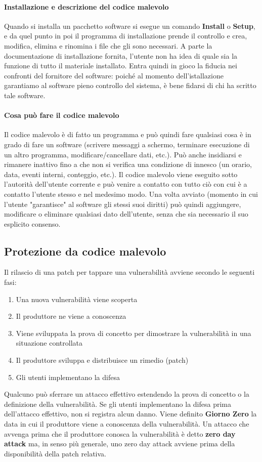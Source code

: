 \paragraph{Installazione e descrizione del codice malevolo}
Quando si installa un pacchetto software si esegue un comando \textbf{Install} o \textbf{Setup}, e da quel punto in poi il programma di installazione prende il controllo e crea, modifica, elimina e rinomina i file che gli sono necessari. A parte la documentazione di installazione fornita, l'utente non ha idea di quale sia la funzione di tutto il materiale installato. Entra quindi in gioco la fiducia nei confronti del fornitore del software: poiché al momento dell'istallazione garantiamo al software pieno controllo del sistema, è bene fidarsi di chi ha scritto tale software.

\paragraph{Cosa può fare il codice malevolo}
Il codice malevolo è di fatto un programma e può quindi fare qualsiasi cosa è in grado di fare un software (scrivere messaggi a schermo, terminare esecuzione di un altro programma, modificare/cancellare dati, etc.).
Può anche insidiarsi e rimanere inattivo fino a che non si verifica una condizione di innesco (un orario, data, eventi interni, conteggio, etc.). Il codice malevolo viene eseguito sotto l'autorità dell'utente corrente e può venire a contatto con tutto ciò con cui è a contatto l'utente stesso e nel medesimo modo. Una volta avviato (momento in cui l'utente "garantisce" al software gli stessi suoi diritti) può quindi aggiungere, modificare o eliminare qualsiasi dato dell'utente, senza che sia necessario il suo esplicito consenso.

\subsection{Protezione da codice malevolo}
Il rilascio di una patch per tappare una vulnerabilità avviene secondo le seguenti fasi:
\begin{enumerate}
\item Una nuova vulnerabilità viene scoperta
\item Il produttore ne viene a conoscenza
\item Viene sviluppata la prova di concetto per dimostrare la vulnerabilità in una situazione controllata
\item Il produttore sviluppa e distribuisce un rimedio (patch)
\item Gli utenti implementano la difesa
\end{enumerate}
Qualcuno può sferrare un attacco effettivo estendendo la prova di concetto o la definizione della vulnerabilità. Se gli utenti implementano la difesa prima dell'attacco effettivo, non si registra alcun danno.
Viene definito \textbf{Giorno Zero} la data in cui il produttore viene a conoscenza della vulnerabilità.
Un attacco che avvenga prima che il produttore conosca la vulnerabilità è detto \textbf{zero day attack} ma, in senso più generale, uno zero day attack avviene prima della disponibilità della patch relativa.

